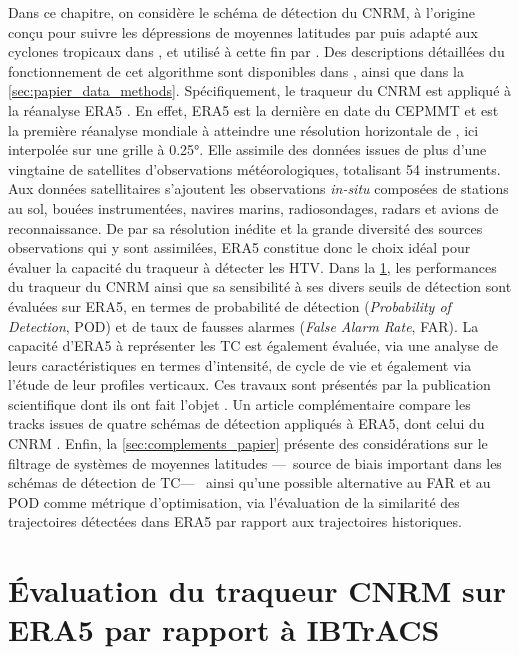 \documentclass[../main.tex]{subfiles}
\begin{document}
Dans ce chapitre, on considère le schéma de détection du CNRM, à l'origine conçu pour suivre les dépressions de moyennes latitudes par
\cite{ayrault_nouvelle_2000} puis adapté aux cyclones tropicaux dans \cite{chauvin_response_2006}, et utilisé à cette fin par
\cite{daloz_impact_2012,chauvin_atlantic_2017,chauvin_future_2020,cattiaux_projected_2020}. Des descriptions détaillées du fonctionnement de cet algorithme sont
disponibles dans \cite{chauvin_response_2006}, ainsi que dans la \cref{sec:papier_data_methods}. Spécifiquement, le traqueur du CNRM est appliqué à la réanalyse
ERA5 \parencite{hersbach_era5_2020}. En effet, ERA5 est la dernière en date du CEPMMT et est la première réanalyse mondiale à atteindre une résolution
horizontale de , ici interpolée sur une grille à \ang{0.25}. Elle assimile des données issues de plus d'une vingtaine de satellites d'observations
météorologiques, totalisant \num{54} instruments. Aux données satellitaires s'ajoutent les observations \textit{in-situ} composées de stations au sol, bouées
instrumentées, navires marins, radiosondages, radars et avions de reconnaissance. De par sa résolution inédite et la grande diversité des sources observations
qui y sont assimilées, ERA5 constitue donc le choix idéal pour évaluer la capacité du traqueur à détecter les HTV. Dans la \cref{sec:eval_tracker_ERA5}, les
performances du traqueur du CNRM ainsi que sa sensibilité à ses divers seuils de détection sont évaluées sur ERA5, en termes de probabilité de détection
(\textit{Probability of Detection}, POD) et de taux de fausses alarmes (\textit{False Alarm Rate}, FAR). La capacité d'ERA5 à représenter les TC est également
évaluée, via une analyse de leurs caractéristiques en termes d'intensité, de cycle de vie et également via l'étude de leur profiles verticaux. Ces travaux sont
présentés par la publication scientifique dont ils ont fait l'objet \parencite{dulac_assessing_2023}. Un article complémentaire compare les tracks issues de
quatre schémas de détection appliqués à ERA5, dont celui du CNRM \parencite{bourdin_intercomparison_2022}. Enfin, la \cref{sec:complements_papier} présente des
considérations sur le filtrage de systèmes de moyennes latitudes ---~source de biais important dans les schémas de détection de TC---~ ainsi qu'une possible
alternative au FAR et au POD comme métrique d'optimisation, via l'évaluation de la similarité des trajectoires détectées dans ERA5 par rapport aux trajectoires
historiques.

\section{Évaluation du traqueur CNRM sur ERA5 par rapport à IBTrACS}\label{sec:eval_tracker_ERA5}
\end{document}

